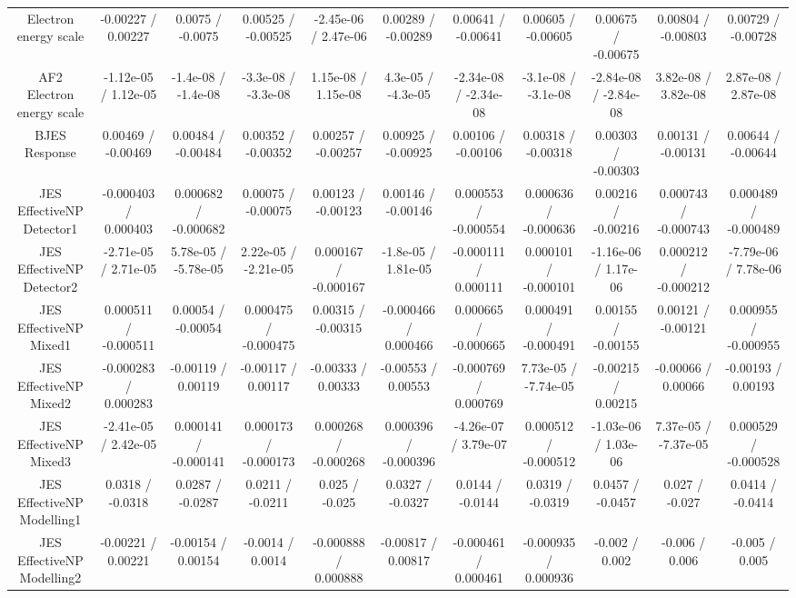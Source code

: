 \begin{table}[htbp]
\begin{center}
\begin{tabular}{|c|c|c|c|c|c|c|c|c|c|c|}
  Electron energy scale & -0.00227 / 0.00227 & 0.0075 / -0.0075 & 0.00525 / -0.00525 & -2.45e-06 / 2.47e-06 & 0.00289 / -0.00289 & 0.00641 / -0.00641 & 0.00605 / -0.00605 & 0.00675 / -0.00675 & 0.00804 / -0.00803 & 0.00729 / -0.00728 \\ 
  AF2 Electron energy scale & -1.12e-05 / 1.12e-05 & -1.4e-08 / -1.4e-08 & -3.3e-08 / -3.3e-08 & 1.15e-08 / 1.15e-08 & 4.3e-05 / -4.3e-05 & -2.34e-08 / -2.34e-08 & -3.1e-08 / -3.1e-08 & -2.84e-08 / -2.84e-08 & 3.82e-08 / 3.82e-08 & 2.87e-08 / 2.87e-08 \\ 
  BJES Response & 0.00469 / -0.00469 & 0.00484 / -0.00484 & 0.00352 / -0.00352 & 0.00257 / -0.00257 & 0.00925 / -0.00925 & 0.00106 / -0.00106 & 0.00318 / -0.00318 & 0.00303 / -0.00303 & 0.00131 / -0.00131 & 0.00644 / -0.00644 \\ 
  JES EffectiveNP Detector1 & -0.000403 / 0.000403 & 0.000682 / -0.000682 & 0.00075 / -0.00075 & 0.00123 / -0.00123 & 0.00146 / -0.00146 & 0.000553 / -0.000554 & 0.000636 / -0.000636 & 0.00216 / -0.00216 & 0.000743 / -0.000743 & 0.000489 / -0.000489 \\ 
  JES EffectiveNP Detector2 & -2.71e-05 / 2.71e-05 & 5.78e-05 / -5.78e-05 & 2.22e-05 / -2.21e-05 & 0.000167 / -0.000167 & -1.8e-05 / 1.81e-05 & -0.000111 / 0.000111 & 0.000101 / -0.000101 & -1.16e-06 / 1.17e-06 & 0.000212 / -0.000212 & -7.79e-06 / 7.78e-06 \\ 
  JES EffectiveNP Mixed1 & 0.000511 / -0.000511 & 0.00054 / -0.00054 & 0.000475 / -0.000475 & 0.00315 / -0.00315 & -0.000466 / 0.000466 & 0.000665 / -0.000665 & 0.000491 / -0.000491 & 0.00155 / -0.00155 & 0.00121 / -0.00121 & 0.000955 / -0.000955 \\ 
  JES EffectiveNP Mixed2 & -0.000283 / 0.000283 & -0.00119 / 0.00119 & -0.00117 / 0.00117 & -0.00333 / 0.00333 & -0.00553 / 0.00553 & -0.000769 / 0.000769 & 7.73e-05 / -7.74e-05 & -0.00215 / 0.00215 & -0.00066 / 0.00066 & -0.00193 / 0.00193 \\ 
  JES EffectiveNP Mixed3 & -2.41e-05 / 2.42e-05 & 0.000141 / -0.000141 & 0.000173 / -0.000173 & 0.000268 / -0.000268 & 0.000396 / -0.000396 & -4.26e-07 / 3.79e-07 & 0.000512 / -0.000512 & -1.03e-06 / 1.03e-06 & 7.37e-05 / -7.37e-05 & 0.000529 / -0.000528 \\ 
  JES EffectiveNP Modelling1 & 0.0318 / -0.0318 & 0.0287 / -0.0287 & 0.0211 / -0.0211 & 0.025 / -0.025 & 0.0327 / -0.0327 & 0.0144 / -0.0144 & 0.0319 / -0.0319 & 0.0457 / -0.0457 & 0.027 / -0.027 & 0.0414 / -0.0414 \\ 
  JES EffectiveNP Modelling2 & -0.00221 / 0.00221 & -0.00154 / 0.00154 & -0.0014 / 0.0014 & -0.000888 / 0.000888 & -0.00817 / 0.00817 & -0.000461 / 0.000461 & -0.000935 / 0.000936 & -0.002 / 0.002 & -0.006 / 0.006 & -0.005 / 0.005 \\ 

\end{tabular}
\end{center}
\end{table}
